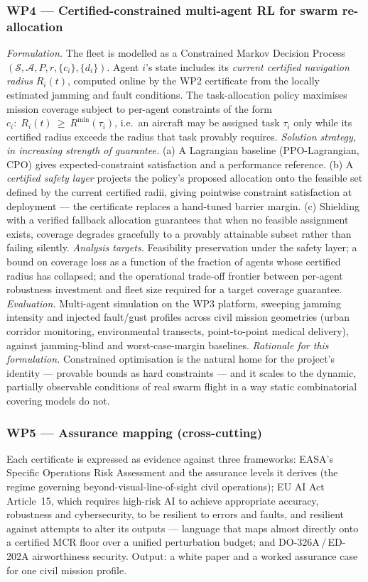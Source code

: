 \documentclass[11pt,a4paper]{article}
\begin{document}
\subsubsection{WP4 --- Certified-constrained multi-agent RL for swarm re-allocation}
\emph{Formulation.} The fleet is modelled as a Constrained Markov Decision Process $(\mathcal S,\mathcal A,P,r,\{c_i\},\{d_i\})$. Agent $i$'s state includes its \emph{current certified navigation radius} $R_i(t)$, computed online by the WP2 certificate from the locally estimated jamming and fault conditions. The task-allocation policy maximises mission coverage subject to per-agent constraints of the form $c_i:\;R_i(t)\ \ge\ R^{\min}(\tau_i)$, i.e.\ an aircraft may be assigned task $\tau_i$ only while its certified radius exceeds the radius that task provably requires. \emph{Solution strategy, in increasing strength of guarantee.} (a) A Lagrangian baseline (PPO-Lagrangian, CPO) gives expected-constraint satisfaction and a performance reference. (b) A \emph{certified safety layer} projects the policy's proposed allocation onto the feasible set defined by the current certified radii, giving pointwise constraint satisfaction at deployment --- the certificate replaces a hand-tuned barrier margin. (c) Shielding with a verified fallback allocation guarantees that when no feasible assignment exists, coverage degrades gracefully to a provably attainable subset rather than failing silently. \emph{Analysis targets.} Feasibility preservation under the safety layer; a bound on coverage loss as a function of the fraction of agents whose certified radius has collapsed; and the operational trade-off frontier between per-agent robustness investment and fleet size required for a target coverage guarantee. \emph{Evaluation.} Multi-agent simulation on the WP3 platform, sweeping jamming intensity and injected fault/gust profiles across civil mission geometries (urban corridor monitoring, environmental transects, point-to-point medical delivery), against jamming-blind and worst-case-margin baselines. \emph{Rationale for this formulation.} Constrained optimisation is the natural home for the project's identity --- provable bounds as hard constraints --- and it scales to the dynamic, partially observable conditions of real swarm flight in a way static combinatorial covering models do not.

\subsubsection{WP5 --- Assurance mapping (cross-cutting)}
Each certificate is expressed as evidence against three frameworks: EASA's Specific Operations Risk Assessment and the assurance levels it derives (the regime governing beyond-visual-line-of-sight civil operations); EU AI Act Article~15, which requires high-risk AI to achieve appropriate accuracy, robustness and cybersecurity, to be resilient to errors and faults, and resilient against attempts to alter its outputs --- language that maps almost directly onto a certified MCR floor over a unified perturbation budget; and DO-326A\,/\,ED-202A airworthiness security. Output: a white paper and a worked assurance case for one civil mission profile.
\end{document}
